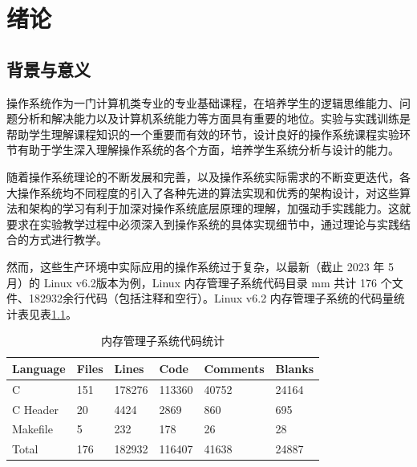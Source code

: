 \documentclass[AutoFakeBold]{LZUThesis}
\begin{document}
\begin{sloppypar}


\mainmatter

\chapter{绪论}


\section{背景与意义}

操作系统作为一门计算机类专业的专业基础课程，在培养学生的逻辑思维能力、问题分析和解决能力以及计算机系统能力等方面具有重要的地位。实验与实践训练是帮助学生理解课程知识的一个重要而有效的环节，设计良好的操作系统课程实验环节有助于学生深入理解操作系统的各个方面，培养学生系统分析与设计的能力。

随着操作系统理论的不断发展和完善，以及操作系统实际需求的不断变更迭代，各大操作系统均不同程度的引入了各种先进的算法实现和优秀的架构设计，对这些算法和架构的学习有利于加深对操作系统底层原理的理解，加强动手实践能力。这就要求在实验教学过程中必须深入到操作系统的具体实现细节中，通过理论与实践结合的方式进行教学。

然而，这些生产环境中实际应用的操作系统过于复杂，以最新（截止 2023 年 5 月）的 Linux v6.2版本为例，Linux 内存管理子系统代码目录 mm 共计 176 个文件、182932余行代码（包括注释和空行）。Linux v6.2 内存管理子系统的代码量统计表见表\ref{table:mm-code-stastic}。

\begin{longtable}[htb]{@{}llllll@{}}
\caption{内存管理子系统代码统计}\label{table:mm-code-stastic} \\
\toprule\noalign{}
Language & Files & Lines & Code & Comments & Blanks \\
\midrule\noalign{}
\endhead
\bottomrule\noalign{}
\endlastfoot
C & 151 & 178276 & 113360 & 40752 & 24164 \\
C Header & 20 & 4424 & 2869 & 860 & 695 \\
Makefile & 5 & 232 & 178 & 26 & 28 \\
Total & 176 & 182932 & 116407 & 41638 & 24887 \\
\end{longtable}


\end{sloppypar}
\end{document}
